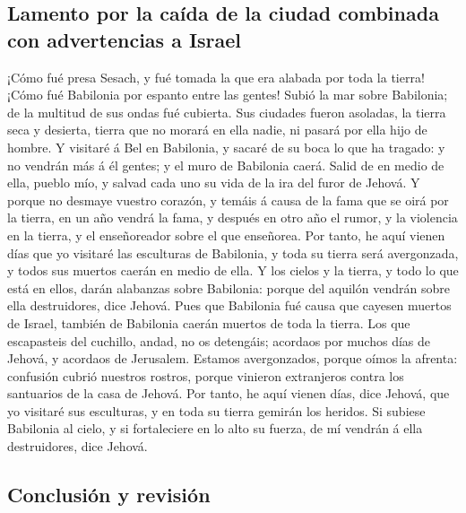 \hypertarget{lamento-por-la-cauxedda-de-la-ciudad-combinada-con-advertencias-a-israel}{%
\subsection{Lamento por la caída de la ciudad combinada con advertencias
a
Israel}\label{lamento-por-la-cauxedda-de-la-ciudad-combinada-con-advertencias-a-israel}}

 ¡Cómo fué presa Sesach, y fué tomada la que era alabada
por toda la tierra! ¡Cómo fué Babilonia por espanto entre las gentes!
 Subió la mar sobre Babilonia; de la multitud de sus ondas
fué cubierta.  Sus ciudades fueron asoladas, la tierra seca
y desierta, tierra que no morará en ella nadie, ni pasará por ella hijo
de hombre.  Y visitaré á Bel en Babilonia, y sacaré de su
boca lo que ha tragado: y no vendrán más á él gentes; y el muro de
Babilonia caerá.  Salid de en medio de ella, pueblo mío, y
salvad cada uno su vida de la ira del furor de Jehová.  Y
porque no desmaye vuestro corazón, y temáis á causa de la fama que se
oirá por la tierra, en un año vendrá la fama, y después en otro año el
rumor, y la violencia en la tierra, y el enseñoreador sobre el que
enseñorea.  Por tanto, he aquí vienen días que yo visitaré
las esculturas de Babilonia, y toda su tierra será avergonzada, y todos
sus muertos caerán en medio de ella.  Y los cielos y la
tierra, y todo lo que está en ellos, darán alabanzas sobre Babilonia:
porque del aquilón vendrán sobre ella destruidores, dice Jehová.
 Pues que Babilonia fué causa que cayesen muertos de
Israel, también de Babilonia caerán muertos de toda la tierra.
 Los que escapasteis del cuchillo, andad, no os detengáis;
acordaos por muchos días de Jehová, y acordaos de Jerusalem.
 Estamos avergonzados, porque oímos la afrenta: confusión
cubrió nuestros rostros, porque vinieron extranjeros contra los
santuarios de la casa de Jehová.  Por tanto, he aquí vienen
días, dice Jehová, que yo visitaré sus esculturas, y en toda su tierra
gemirán los heridos.  Si subiese Babilonia al cielo, y si
fortaleciere en lo alto su fuerza, de mí vendrán á ella destruidores,
dice Jehová.

\hypertarget{conclusiuxf3n-y-revisiuxf3n}{%
\subsection{Conclusión y revisión}\label{conclusiuxf3n-y-revisiuxf3n}}

